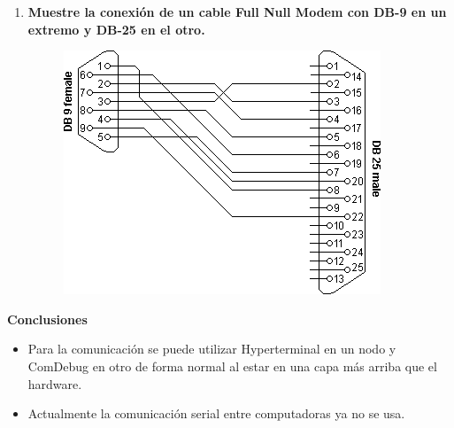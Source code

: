 \documentclass[a4paper,12pt]{article}
\begin{document}
\begin{enumerate}
  \item \textbf{Muestre la conexión de un cable Full Null Modem con DB-9 en un extremo y DB-25 en el otro.}
  
  \begin{figure}[H]
   \centering
   \includegraphics[scale = 0.7]{11.png}
  \end{figure}
 \end{enumerate}
  
  \begin{large}
   \textbf{Conclusiones}
  \end{large}
  
  \begin{itemize}
   \item Para la comunicación se puede utilizar Hyperterminal en un nodo y ComDebug en otro de forma normal al estar en una capa
   más arriba que el hardware.
   \item Actualmente la comunicación serial entre computadoras ya no se usa.
  \end{itemize}

  

  
 
\end{document}

